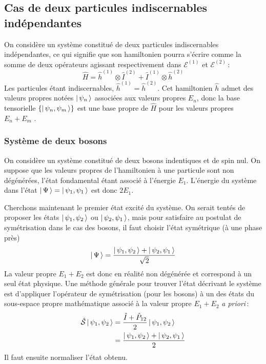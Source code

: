         \subsection{Cas de deux particules indiscernables indépendantes}

    On considère un système constitué de deux particules indiscernables indépendantes, ce qui signifie que son hamiltonien pourra s’écrire comme la somme de deux opérateurs agissant respectivement dans $\mathcal{E}^{(1)}$ et $\mathcal{E}^(2)$ :
    \[ \hat{H} = \hat{h}^{(1)} \otimes \hat{I}^{(2)} +  \hat{I}^{(1)} \otimes \hat{h}^{(2)} \]   
    Les particules étant indiscernables, $\hat{h}^{(1)} = \hat{h}^{(2)}$. Cet hamiltonien $\hat{h}$ admet des valeurs propres notées $\left| \, \psi_n \, \right>$ associées aux valeurs propres $E_n$, donc la base tensorielle $\left\{\left| \, \psi_n, \psi_m \, \right>\right\}$ est une base propre de $\hat{H}$ pour les valeurs propres $E_n + E_m$ .

        \subsubsection{Système de deux bosons}

        On considère un système constitué de deux bosons indentiques et de spin nul. On suppose que les valeurs propres de l’hamiltonien à une particule sont non dégénérées, l’état fondamental étant associé à l’énergie $E_1$. L’énergie du système dans l’état $\left| \, \Psi \, \right> = \left| \, \psi_1, \psi_1 \, \right>$ est donc $2E_1$.

        Cherchons maintenant le premier état excité du système. On serait tentés de proposer les états $\left| \, \psi_1, \psi_2 \, \right>$ ou $\left| \, \psi_2, \psi_1 \, \right>$, mais pour satisfaire au postulat de symétrisation dans le cas des bosons, il faut choisir l’état symétrique (à une phase près)
        \[ \left| \, \Psi \, \right> = \frac{\left| \, \psi_1, \psi_2 \, \right> + \left| \, \psi_2, \psi_1 \, \right>}{\sqrt{2}} \] 
        La valeur propre $E_1 + E_2$ est donc en réalité non dégénérée et correspond à un seul état physique. Une méthode générale pour trouver l’état décrivant le système est d’appliquer l’opérateur de symétrisation (pour les bosons) à un des états du sous-espace propre mathématique associé à la valeur propre $E_1 + E_2$ \textit{a priori} :
        \begin{align*}
            \hat{\mathcal{S}} \left| \, \psi_1, \psi_2 \, \right> 
            &= \frac{\hat{I} + \hat{P}_{12}}{2} \left| \, \psi_1, \psi_2 \, \right> \\
            &= \frac{\left| \, \psi_1, \psi_2 \, \right> + \left| \, \psi_2, \psi_1 \, \right>}{2} 
        \end{align*}
        Il faut ensuite normaliser l’état obtenu.

